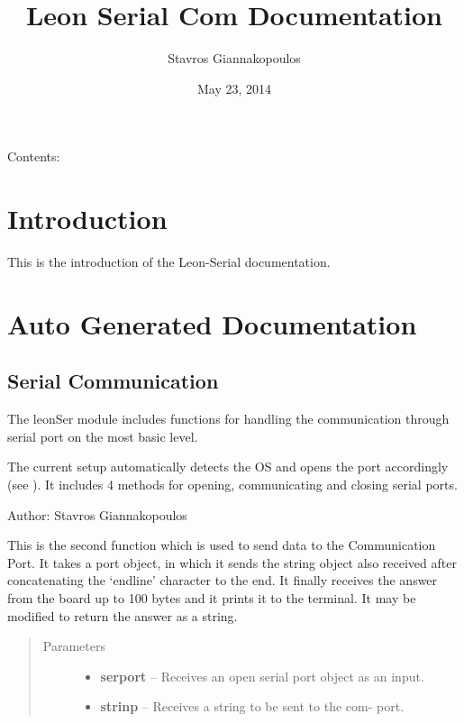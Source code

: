 \documentclass[letterpaper,10pt,english]{sphinxmanual}
\title{Leon Serial Com Documentation}
\date{May 23, 2014}
\author{Stavros Giannakopoulos}
\begin{document}
\maketitle
\tableofcontents
{}\label{index::doc}


Contents:


\chapter{Introduction}
\label{Introduction:introduction}\label{Introduction::doc}\label{Introduction:welcome-to-leon-serial-com-s-documentation}
This is the introduction of the Leon-Serial documentation.


\chapter{Auto Generated Documentation}
\label{Code:auto-generated-documentation}\label{Code::doc}

\section{Serial Communication}
\label{Code:module-leonSer}\label{Code:serial-communication}
The leonSer module includes functions for handling the communication through serial port on the 
most basic level.

The current setup automatically detects the OS and opens the port accordingly (see ). 
It includes 4 methods for opening, communicating and closing serial ports.

Author: Stavros Giannakopoulos

\begin{fulllineitems}
\label{Code:leonSer.leonTx}
This is the second function which is used to send data to the Communication Port.
It takes a port object, in which it sends the string object also received after concatenating 
the `endline' character to the end.     
It finally receives the answer from the board  up to 100 bytes and it prints it to the terminal.
It may be modified to return the answer as a string.
\begin{quote}\begin{description}
\item[{Parameters}] \leavevmode\begin{itemize}
\item {} 
\textbf{serport} -- Receives an open serial port object as an input.

\item {} 
\textbf{strinp} -- Receives a string to be sent to the com- port.

\end{itemize}

\end{description}\end{quote}

\end{fulllineitems}
\end{document}
